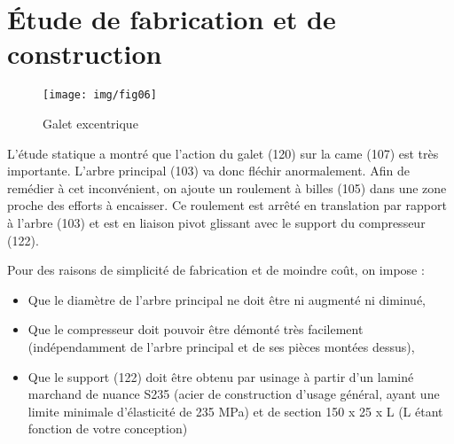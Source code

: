 
\section{Étude de fabrication et de construction}


 \begin{figure}[!h]
\begin{center}
	\texttt{[image: img/fig06]}
\end{center}
\caption{Galet excentrique}
\label{fig06}
\end{figure} 






L'étude statique a montré que l'action du galet (120) sur la came (107) est très importante. L'arbre principal (103) va donc fléchir anormalement. Afin de remédier à cet inconvénient, on ajoute un roulement à billes (105) dans une zone proche des efforts à encaisser. Ce roulement est arrêté en translation par rapport à l'arbre (103) et est en liaison pivot glissant avec le support du compresseur (122).

Pour des raisons de simplicité de fabrication et de moindre coût, on impose :
\begin{itemize}
 \item Que le diamètre de l'arbre principal ne doit être ni augmenté ni diminué,
 \item Que le compresseur doit pouvoir être démonté très facilement (indépendamment de l'arbre principal et de ses pièces montées dessus),
 \item Que le support (122) doit être obtenu par usinage à partir d'un laminé marchand de nuance S235 (acier de construction d'usage général, ayant une limite minimale d'élasticité de 235 MPa) et de section 150 x 25 x L (L étant fonction de votre conception)
\end{itemize}

